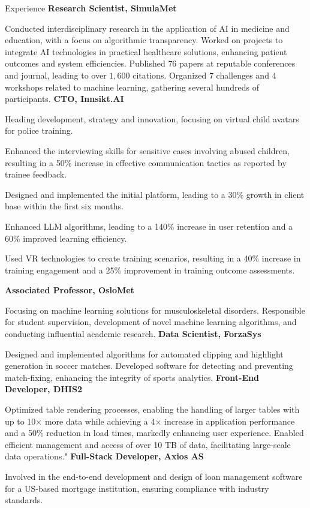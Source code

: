 \begin{rubric}{Experience}
%
\entry*[2021 -- present]%
\textbf{Research Scientist, SimulaMet} \par
Conducted interdisciplinary research in the application of AI in medicine and education, with a focus on algorithmic transparency.
Worked on projects to integrate AI technologies in practical healthcare solutions, enhancing patient outcomes and system efficiencies.
Published $76$ papers at reputable conferences and journal, leading to over $1,600$ citations. Organized $7$ challenges and $4$ workshops related to machine learning, gathering several hundreds of participants.
%
\entry*[2023 -- present]%
\textbf{CTO, Innsikt.AI} \par
\begin{compactitem}
\item Heading development, strategy and innovation, focusing on virtual child avatars for police training.
\item Enhanced the interviewing skills for sensitive cases involving abused children, resulting in a 50\% increase in effective communication tactics as reported by trainee feedback.
\item Designed and implemented the initial platform, leading to a 30\% growth in client base within the first six months.
\item Enhanced LLM algorithms, leading to a 140\% increase in user retention and a 60\% improved learning efficiency.
\item Used VR technologies to create training scenarios, resulting in a 40\% increase in training engagement and a 25\% improvement in training outcome assessments.
\vspace{-12pt}
\end{compactitem}
%
\entry*[2023 -- present]%
\textbf{Associated Professor, OsloMet} \par
Focusing on machine learning solutions for musculoskeletal disorders.
Responsible for student supervision, development of novel machine learning algorithms, and conducting influential academic research.
%
\entry*[2022 -- 2023]%
\textbf{Data Scientist, ForzaSys} \par
Designed and implemented algorithms for automated clipping and highlight generation in soccer matches.
Developed software for detecting and preventing match-fixing, enhancing the integrity of sports analytics.
%
\entry*[2017 -- 2018]%
\textbf{Front-End Developer, DHIS2} \par
Optimized table rendering processes, enabling the handling of larger tables with up to 10$\times$ more data while achieving a 4$\times$ increase in application performance and a 50\% reduction in load times, markedly enhancing user experience. Enabled efficient management and access of over 10 TB of data, facilitating large-scale data operations."
%
\entry*[2014 -- 2016]%
\textbf{Full-Stack Developer, Axios AS} \par
Involved in the end-to-end development and design of loan management software for a US-based mortgage institution, ensuring compliance with industry standards.
%
\end{rubric}